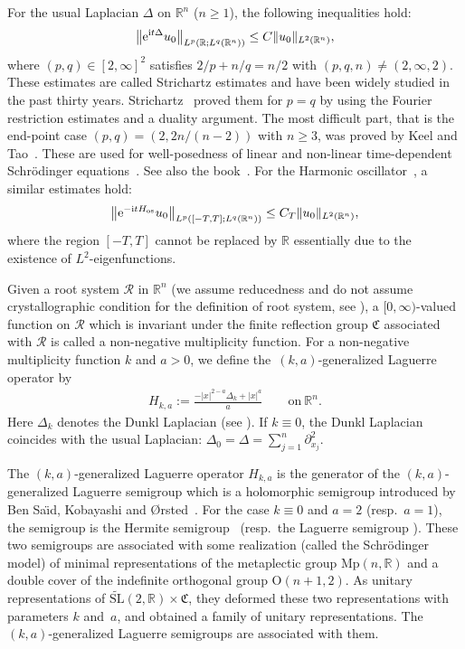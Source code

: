 \documentclass[pdftex]{sigma}
\numberwithin{equation}{section}
\def\R{\mathbb{R}}%
\def\SL{\mathrm{SL}}
\def\pa{\partial}
\newcommand{\cR}{\mathcal{R}}
\begin{document}
For the usual Laplacian $\Delta$ on $\R^n$ ($n\ge 1$), the following inequalities hold:
\begin{align*}
\big\|{\rm e}^{{\rm i}t\Delta}u_0\big\|_{L^p(\R;L^q(\R^n))}\leq C\|u_0\|_{L^2(\R^n)},
\end{align*}
where $(p,q)\in [2,\infty]^2$ satisfies $2/p+n/q=n/2$ with $(p,q,n)\neq (2,\infty,2)$. These estimates are called Strichartz estimates and have been widely studied in the past thirty years. Strichartz~\cite{St} proved them for $p=q$ by using the Fourier restriction estimates and a duality argument. The most difficult part, that is the end-point case $(p,q)=(2,2n/(n-2))$ with $n\geq 3$, was proved by Keel and Tao~\cite{KT}.
These are used for well-posedness of linear and non-linear time-dependent Schr\"odinger equations~\cite{GV,Y}. See also the book~\cite{T}. For the Harmonic oscillator~, a similar estimates hold:
\[
\big\|{\rm e}^{-{\rm i}tH_{\rm os}}u_0\big\|_{L^p([-T,T];L^q(\R^n))}\leq C_T\|u_0\|_{L^2(\R^n)},
\]
 where the region $[-T,T]$ cannot be replaced by $\R$ essentially due to the existence of $L^2$-eigenfunctions.

Given a root system $\cR$ in $\R^n$ (we assume reducedness and do not assume crystallographic condition for the definition of root system, see \cite[Definition~2.1]{BKO}), a $[0,\infty)$-valued function on $\cR$ which is invariant under the finite reflection group $\mathfrak{C}$ associated with $\cR$ is called a non-negative multiplicity function.
For a non-negative multiplicity function $k$ and $a>0$, we define the~$(k,a)$-generalized Laguerre operator by
\begin{align*}
H_{k,a}:=\frac{-|x|^{2-a}\Delta_k+|x|^a}{a}\qquad \text{on} \ \R^n.
\end{align*}
Here $\Delta_k$ denotes the Dunkl Laplacian (see \cite[formula~(2.9)]{BKO}).
If $k\equiv 0$, the Dunkl Laplacian coincides with the usual Laplacian: $\Delta_0=\Delta=\sum_{j=1}^n\pa_{x_j}^2$.

The $(k,a)$-generalized Laguerre operator $H_{k,a}$ is the generator of the $(k,a)$-generalized Laguerre semigroup which is a holomorphic semigroup introduced by Ben Sa\"{\i}d, Kobayashi and {\O}rsted~\cite{BKO}.
For the case $k\equiv 0$ and $a=2$ (resp.\ $a=1$), the semigroup is the Hermite semigroup~\cite{Fol, H} (resp.\ the Laguerre semigroup \cite{KM1, KM, KM2}).
These two semigroups are associated with some realization (called the Schr\"odinger model) of minimal representations of the metaplectic group $\mathrm{Mp}(n,\R)$ and a double cover of the indefinite orthogonal group $\mathrm{O}(n+1,2)$.
As unitary representations of $\widetilde{\SL}(2,\R)\times\mathfrak{C}$, they deformed these two representations with parameters $k$ and~$a$, and obtained a family of unitary representations.
The $(k,a)$-generalized Laguerre semigroups are associated with them.
\end{document}
